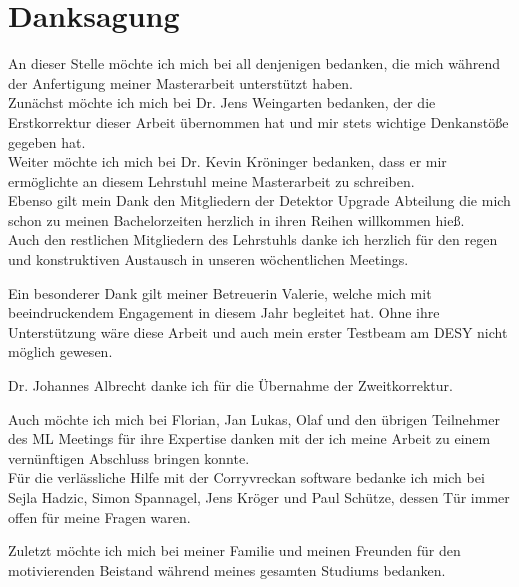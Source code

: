 \thispagestyle{empty}
\section*{Danksagung}

An dieser Stelle möchte ich mich bei all denjenigen bedanken, die mich während
der Anfertigung meiner Masterarbeit unterstützt haben. \\
Zunächst möchte ich mich bei Dr. Jens Weingarten bedanken, der die Erstkorrektur dieser Arbeit übernommen hat und mir stets wichtige Denkanstöße
gegeben hat.\\
Weiter möchte ich mich bei Dr. Kevin Kröninger bedanken, dass er mir ermöglichte an diesem Lehrstuhl meine Masterarbeit zu schreiben. \\
Ebenso gilt mein Dank den Mitgliedern der Detektor Upgrade Abteilung die mich schon zu meinen Bachelorzeiten herzlich in ihren Reihen willkommen hieß. \\
Auch den restlichen Mitgliedern des Lehrstuhls danke ich herzlich für den regen und konstruktiven Austausch in unseren wöchentlichen Meetings.

Ein besonderer Dank gilt meiner Betreuerin Valerie, welche mich mit beeindruckendem Engagement in diesem Jahr begleitet hat. Ohne ihre Unterstützung wäre
diese Arbeit und auch mein erster Testbeam am DESY nicht möglich gewesen.

Dr. Johannes Albrecht danke ich für die Übernahme der Zweitkorrektur.

Auch möchte ich mich bei Florian, Jan Lukas, Olaf und den übrigen Teilnehmer des ML Meetings für ihre Expertise danken mit der ich meine Arbeit zu einem vernünftigen
Abschluss bringen konnte. \\
Für die verlässliche Hilfe mit der Corryvreckan software bedanke ich mich bei Sejla Hadzic, Simon Spannagel, Jens Kröger und Paul Schütze, dessen Tür immer
offen für meine Fragen waren.

Zuletzt möchte ich mich bei meiner Familie und meinen Freunden für den motivierenden Beistand
während meines gesamten Studiums bedanken.
